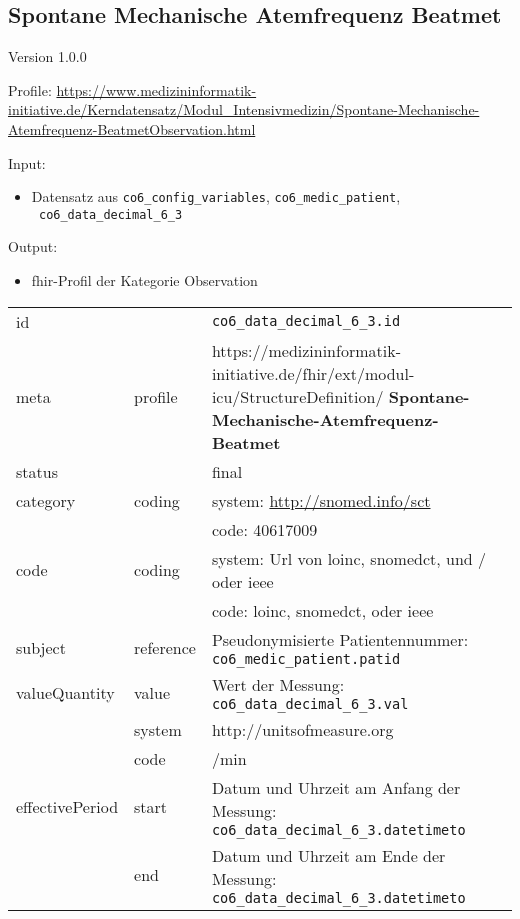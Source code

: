 \subsection{Spontane Mechanische Atemfrequenz Beatmet} 
\noindent Version 1.0.0

\noindent Profile: \url{https://www.medizininformatik-initiative.de/Kerndatensatz/Modul_Intensivmedizin/Spontane-Mechanische-Atemfrequenz-BeatmetObservation.html}

\noindent Input:
\begin{itemize}
	\item Datensatz aus \texttt{co6\_config\_variables}, \texttt{co6\_medic\_patient}, \\ \texttt{
co6\_data\_decimal\_6\_3}
\end{itemize}
Output:
\begin{itemize}
        \item \ac{fhir}-Profil der Kategorie \glqq Observation\grqq{}
\end{itemize}
\begin{longtable}{|l|l|p{7.5cm}|}
        \hline
        \rowcolor{lightgray} \multicolumn{3}{|l|}{Data Mapping (inhaltlich)} \\ \hline
        id &  & \texttt{co6\_data\_decimal\_6\_3.id} \\ \hline
	meta & profile & https://medizininformatik-initiative.de/fhir/ext/modul-icu/StructureDefinition/\textbf{
Spontane-Mechanische-Atemfrequenz-Beatmet} \\ \hline 
	status &  & final  \\ \hline 
	category & coding & system: \url{http://snomed.info/sct} \\
\cline{3-3}
	& & code: 40617009 \\ \hline
	code & coding & system: Url von \ac{loinc}, \ac{snomedct}, und / oder \ac{ieee} \\ 
	\cline{3-3} 
	 &  & code: \ac{loinc}, \ac{snomedct}, oder \ac{ieee} \\ \hline
	subject & reference & Pseudonymisierte Patientennummer: \texttt{co6\_medic\_patient.patid} \\ \hline
	valueQuantity & value & Wert der Messung: \texttt{
co6\_data\_decimal\_6\_3.val} \\
        \cline{2-3}
         & system & http://unitsofmeasure.org \\
         \cline{2-3}
         & code & /min \\ \hline
    effectivePeriod & start & Datum und Uhrzeit am Anfang der Messung: \texttt{
co6\_data\_decimal\_6\_3.datetimeto} \\
    \cline{2-3}
     & end & Datum und Uhrzeit am Ende der Messung: \texttt{
co6\_data\_decimal\_6\_3.datetimeto} \\ \hline
\end{longtable}



